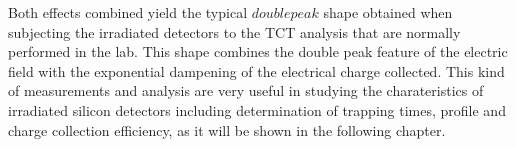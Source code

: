 Both effects combined yield the typical $double peak$ shape obtained when subjecting the irradiated detectors to the TCT analysis that are normally performed in the lab. This shape combines the double peak feature of the electric field with the exponential dampening of the electrical charge collected. This kind of measurements and analysis are very useful in studying the charateristics of irradiated silicon detectors including determination of trapping times, \neff profile and charge collection efficiency, as it will be shown in the following chapter.






















